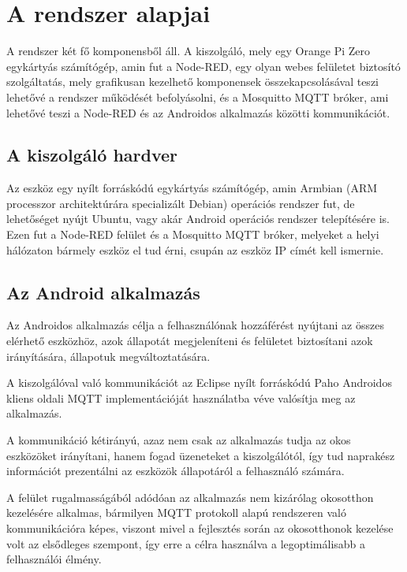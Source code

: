 \documentclass[]{thesis-ekf}
\theoremstyle{definition}
\theoremstyle{remark}
\begin{document}
\chapter{A rendszer alapjai}
A rendszer két fő komponensből áll. A kiszolgáló, mely egy Orange Pi Zero egykártyás számítógép, 
amin fut a Node-RED\cite{nodeRed}, egy olyan webes felületet biztosító szolgáltatás, 
mely grafikusan kezelhető komponensek összekapcsolásával teszi lehetővé a rendszer működését befolyásolni, 
és a Mosquitto MQTT bróker\cite{mosquitto}, ami lehetővé teszi a Node-RED és az Androidos alkalmazás  
közötti kommunikációt.

\section{A kiszolgáló hardver}
Az eszköz egy nyílt forráskódú egykártyás számítógép, amin Armbian\cite{armbian} (ARM processzor architektúrára specializált Debian) 
operációs rendszer fut, de lehetőséget nyújt Ubuntu, vagy akár Android operációs rendszer telepítésére is. 
Ezen fut a Node-RED felület és a Mosquitto MQTT bróker, melyeket a helyi hálózaton bármely eszköz el tud érni, 
csupán az eszköz IP címét kell ismernie.

\section{Az Android alkalmazás}
Az Androidos alkalmazás célja a felhasználónak hozzáférést nyújtani az összes elérhető eszközhöz, 
azok állapotát megjeleníteni és felületet biztosítani azok irányítására, állapotuk megváltoztatására. 

A kiszolgálóval való kommunikációt az Eclipse nyílt forráskódú Paho\cite{paho} 
Androidos kliens oldali MQTT implementációját használatba véve valósítja meg az alkalmazás. 

A kommunikáció kétirányú, azaz nem csak az alkalmazás tudja az okos eszközöket irányítani, 
hanem fogad üzeneteket a kiszolgálótól, így tud naprakész információt prezentálni az eszközök állapotáról a felhasználó számára.

A felület rugalmasságából adódóan az alkalmazás  nem kizárólag okosotthon kezelésére alkalmas, bármilyen MQTT protokoll alapú rendszeren 
való kommunikációra képes, viszont mivel a fejlesztés során az okosotthonok kezelése volt az elsődleges szempont, 
így erre a célra használva a legoptimálisabb a felhasználói élmény.
\end{document}
